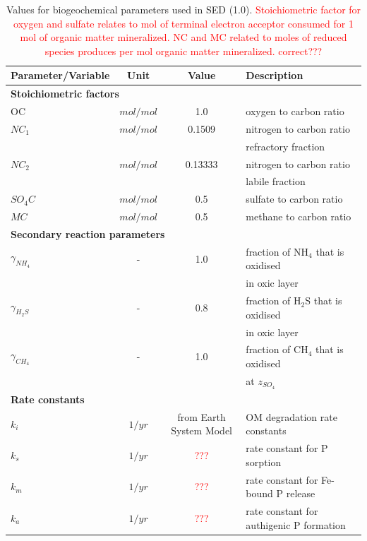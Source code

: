 \documentclass[gmd, manuscript]{copernicus}
\begin{document}
\begin{table}[hbtp]
\caption{Values for biogeochemical parameters used in SED (1.0). \textcolor{red}{Stoichiometric factor for oxygen and sulfate relates to mol of terminal electron acceptor consumed for 1 mol of organic matter mineralized. 
NC and MC related to moles of reduced species produces per mol organic matter mineralized. correct???}}
\centering
\begin{tabular}{l c c l}
\hline\hline
Parameter/Variable & Unit  & Value & Description\\
\hline
\multicolumn{4}{l}{\textbf{Stoichiometric factors}}\\
OC & $mol/mol$ & 1.0 & oxygen to carbon ratio\\
$NC_1$ & $mol/mol$ & 0.1509 & nitrogen to carbon ratio\\
& & & refractory fraction\\
$NC_2$ & $mol/mol$ & 0.13333 & nitrogen to carbon ratio\\
& & & labile fraction\\
$SO_4C$ & $mol/mol$ & 0.5 & sulfate to carbon ratio\\
$MC$ & $mol/mol$ & 0.5 & methane to carbon ratio\\
\multicolumn{4}{l}{\textbf{Secondary reaction parameters}}\\
$\gamma_{NH_4}$ & - & 1.0 & fraction of NH$_4$ that is oxidised\\
& & & in oxic layer\\
$\gamma_{H_2S}$ & - & 0.8 & fraction of H$_2$S that is oxidised\\
& & & in oxic layer\\
$\gamma_{CH_4}$ & - & 1.0 & fraction of CH$_4$ that is oxidised\\
& & & at $z_{SO_4}$\\
\multicolumn{4}{l}{\textbf{Rate constants}}\\
$k_i$ & $1/yr$ & from Earth System Model & OM degradation rate constants\\
$k_s$ & $1/yr$ & \textcolor{red}{???} & rate constant for P sorption\\
$k_m$ & $1/yr$ & \textcolor{red}{???} & rate constant for Fe-bound P release\\
$k_a$ & $1/yr$ & \textcolor{red}{???} & rate constant for authigenic P formation\\

\hline\hline
\end{tabular}
\label{table:reaction_parameters}
\end{table}
\end{document}

